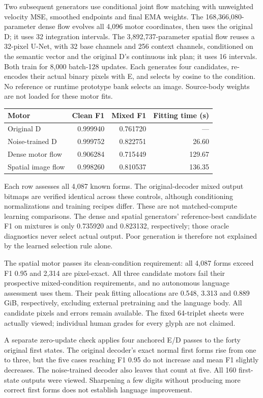 Two subsequent generators use conditional joint flow matching with unweighted
velocity MSE, smoothed endpoints and final EMA weights. The 168,366,080-parameter
dense flow evolves all 4,096 motor coordinates, then uses the original D;
it uses 32 integration intervals. The 3,892,737-parameter spatial flow reuses
a 32-pixel U-Net, with 32 base channels and 256 context channels, conditioned
on the semantic vector and the original D's continuous ink plan; it uses
16 intervals. Both train for 8,000 batch-128 updates. Each generates four
candidates, re-encodes their actual binary pixels with E, and selects by
cosine to the condition. No reference or runtime prototype bank selects an
image. Source-body weights are not loaded for these motor fits.

\begin{center}\small
\begin{tabular}{lrrr}
\hline
Motor & Clean F1 & Mixed F1 & Fitting time (s)\\
\hline
Original D & 0.999940 & 0.761720 & ---\\
Noise-trained D & 0.999752 & 0.822751 & 26.60\\
Dense motor flow & 0.906284 & 0.715449 & 129.67\\
Spatial image flow & 0.998260 & 0.810537 & 136.35\\
\hline
\end{tabular}
\end{center}
Each row assesses all 4,087 known forms. The original-decoder mixed output
bitmaps are verified identical across these controls, although conditioning
normalizations and training recipes differ. These are not matched-compute
learning comparisons. The dense and spatial generators' reference-best
candidate F1 on mixtures is only 0.735920 and 0.823132, respectively; those
oracle diagnostics never select actual output. Poor generation is therefore
not explained by the learned selection rule alone.

The spatial motor passes its clean-condition requirement: all 4,087 forms
exceed F1 0.95 and 2,314 are pixel-exact. All three candidate motors fail
their prospective mixed-condition requirements, and no autonomous language
assessment uses them. Their peak fitting allocations are 0.548, 3.313 and
0.889\,GiB, respectively, excluding external pretraining and the language body.
All candidate pixels and errors remain available. The fixed 64-triplet sheets
were actually viewed; individual human grades for every glyph are not claimed.

A separate zero-update check applies four anchored E/D passes to the forty
original first states. The original decoder's exact normal first forms rise
from one to three, but the five cases reaching F1 0.95 do not increase and
mean F1 slightly decreases. The noise-trained decoder also leaves that count
at five. All 160 first-state outputs were viewed. Sharpening a few digits
without producing more correct first forms does not establish language
improvement.

